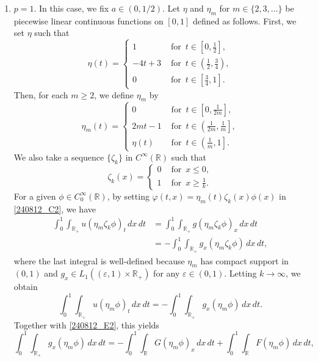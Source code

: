 \documentclass[reqno]{amsart}
\numberwithin{equation}{section}
\theoremstyle{plain}
\theoremstyle{definition}
\def\bR{\mathbb{R}}
\begin{document}
\bigskip

\begin{enumerate}[1.]
\item
$p=1$.
In this case, we fix $a\in (0, 1/2)$.
Let $\eta$ and $\eta_m$ for $m\in \{2,3,\ldots\}$ be piecewise linear continuous functions on $[0,1]$ defined as follows.
First, we set $\eta$ such that
\[
\eta(t)=
\begin{cases}
    1 & \text{ for }\, t\in \left[0, \frac{1}{2}  \right], \\[5pt]
    -4t+3 & \text{ for }\, t \in \left( \frac{1}{2} , \frac{3}{4}  \right), \\[5pt]
    0 & \text{ for }\, t\in \left[ \frac{3}{4}, 1 \right].
\end{cases}
\]
Then, for each $m \ge 2$, we define $\eta_m$ by
\[
\eta_m(t)=
\begin{cases}
    0 & \text{ for }\,  t\in \left[0, \frac{1}{2m} \right], \\[5pt]
    2mt-1 & \text{ for }\,  t \in \left( \frac{1}{2m}, \frac{1}{m} \right], \\[5pt]
    \eta(t) & \text{ for }\, t \in \left( \frac{1}{m}, 1 \right].
\end{cases}
\]
We also take a sequence $\{\zeta_k\}$ in  $C^\infty(\bR)$ such that
\[
\zeta_k(x) = \begin{cases}
    0 & \text{ for  }\, x\le 0, \\[5pt]
    1 & \text{ for }\,  x \ge \frac{1}{k} .
\end{cases}
\]
For a given $\phi\in C^\infty_0(\bR)$, by setting $\varphi(t,x)=\eta_m(t)\zeta_k(x)\phi(x)$ in \eqref{240812_C2}, we have 
$$
\begin{aligned}
\int_0^1 \int_{\bR_+} u (\eta_m \zeta_k \phi)_t\,dx\,dt
&=\int_0^1 \int_{\bR_+} g (\eta_m \zeta_k \phi)_x\,dx\,dt\\
&=-\int_0^1 \int_{\bR_+} g_x (\eta_m \zeta_k \phi)\,dx\,dt,
\end{aligned}
$$
where the last integral is well-defined because $\eta_m$ has compact support in $(0,1)$ and $g_x\in L_{1}((\varepsilon, 1)\times \bR_+)$ for any $\varepsilon\in (0,1)$.
Letting $k\to \infty$, we obtain
$$
\int_0^1 \int_{\bR_+} u(\eta_m \phi)_t\,dx\,dt=-\int_0^1 \int_{\bR_+} g_x(\eta_m \phi)\,dx\,dt.
$$
Together with  \eqref{240812_E2}, this  yields
\begin{equation}		\label{240812_F1}
\int_0^1 \int_{\bR_+} g_x(\eta_m \phi)\,dx\,dt=-\int_0^1 \int_{\bR} G (\eta_m \phi)_x\,dx\,dt+\int_0^1 \int_{\bR} F (\eta_m \phi)\,dx\,dt,
\end{equation}

\end{enumerate}
\end{document}
